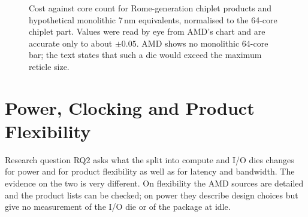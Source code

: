 \begin{figure}[htbp]
\centering
{}
\caption[Cost of chiplet and hypothetical monolithic Rome-generation products (AMD)]{Cost against core count for Rome-generation chiplet products and hypothetical monolithic 7\,nm equivalents, normalised to the 64-core chiplet part. Values were read by eye from AMD's chart \cite[Fig.~2.2.2]{naffziger2020chiplet} and are accurate only to about $\pm 0.05$. AMD shows no monolithic 64-core bar; the text states that such a die would exceed the maximum reticle size.}
\label{fig:chiplet-cost-chart}
\end{figure}

\section{Power, Clocking and Product Flexibility}
\label{sec:power-flexibility}
Research question RQ2 asks what the split into compute and I/O dies changes for power and for product flexibility as well as for latency and bandwidth. The evidence on the two is very different. On flexibility the AMD sources are detailed and the product lists can be checked; on power they describe design choices but give no measurement of the I/O die or of the package at idle.

